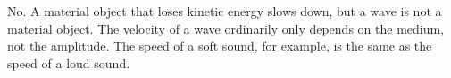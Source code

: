 No. A material object that loses kinetic energy slows down, but a wave is not
a material object. The velocity of a wave ordinarily only depends on the medium,
not the amplitude. The speed of a soft sound, for example, is the same as
the speed of a loud sound.



